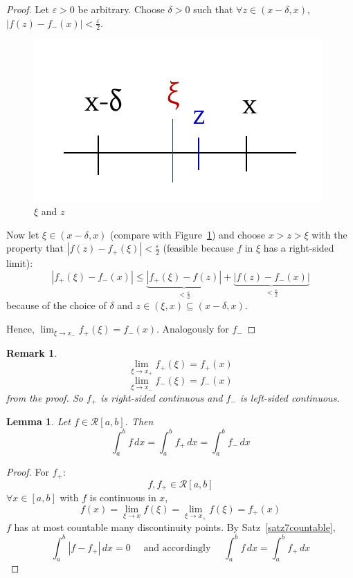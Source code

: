 \documentclass{article}
\newtheorem{lemma}{Lemma}  \numberwithin{lemma}{section}
\newtheorem{remark}{Remark}  \numberwithin{remark}{section}
\newcommand{\card}[1]{\left|#1\right|}
\begin{document}
\begin{proof}
  Let $\varepsilon > 0$ be arbitrary. Choose $\delta > 0$ such that $\forall z \in (x - \delta, x)$, $\card{f(z) - f_-(x)} < \frac\varepsilon2$.

  \begin{figure}[t]
    \begin{center}
      \includegraphics{img/21_xi_z.pdf}
      \caption{$\xi$ and $z$}
      \label{img:xiz}
    \end{center}
  \end{figure}

  Now let $\xi \in (x - \delta, x)$ (compare with Figure~\ref{img:xiz}) and choose $x > z > \xi$ with the property that $\card{f(z) - f_+(\xi)} < \frac\varepsilon2$ (feasible because $f$ in $\xi$ has a right-sided limit):
  \[
    \card{f_+(\xi) - f_-(x)}
    \leq \underbrace{\card{f_+(\xi) - f(z)}}_{< \frac\varepsilon2} + \underbrace{\card{f(z) - f_-(x)}}_{< \frac\varepsilon2}
  \]
  because of the choice of $\delta$ and $z \in (\xi, x) \subseteq (x - \delta, x)$.

  Hence, $\lim_{\xi \to x_-} f_+(\xi) = f_-(x)$. Analogously for $f_-$
\end{proof}

\begin{remark}
  \[ \lim_{\xi \to x_+} f_+(\xi) = f_+(x) \]
  \[ \lim_{\xi \to x_-} f_-(\xi) = f_-(x) \]
  from the proof. So $f_+$ is right-sided continuous and $f_-$ is left-sided continuous.
\end{remark}

\begin{lemma} %
  Let $f \in \mathcal R[a,b]$. Then
  \[ \int_a^b f \, dx = \int_a^b f_+ \, dx = \int_a^b f_- \, dx \]
\end{lemma}

\begin{proof}
  For $f_+$:
  \[ f, f_+ \in \mathcal R[a,b] \]
  $\forall x \in [a,b]$ with $f$ is continuous in $x$,
  \[ f(x) = \lim_{\xi\to x} f(\xi) = \lim_{\xi\to x_+} f(\xi) = f_+(x) \]
  $f$ has at most countable many discontinuity points. By Satz~\ref{satz7countable},
  \[
    \int_a^b \card{f - f_+} \, dx = 0
    \quad \text{ and accordingly } \quad
    \int_a^b f \, dx = \int_a^b f_+ \, dx
  \]
\end{proof}
\end{document}
